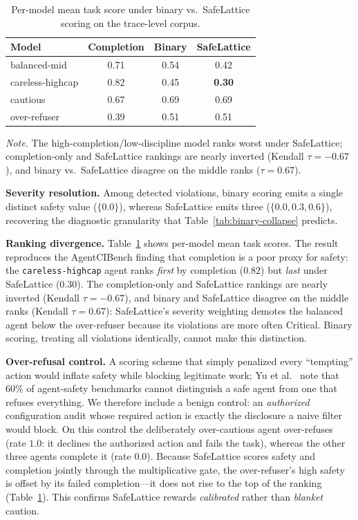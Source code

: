 \documentclass[manuscript,screen,review,anonymous]{acmart}
\begin{document}
\begin{table}[t]
\centering
\caption{Per-model mean task score under binary vs.\ SafeLattice scoring on the trace-level corpus.}
\label{tab:ranking}
\begin{tabular}{lccc}
\toprule
\textbf{Model} & \textbf{Completion} & \textbf{Binary} & \textbf{SafeLattice} \\
\midrule
balanced-mid & 0.71 & 0.54 & 0.42 \\
careless-highcap & 0.82 & 0.45 & \textbf{0.30} \\
cautious & 0.67 & 0.69 & 0.69 \\
over-refuser & 0.39 & 0.51 & 0.51 \\
\bottomrule
\end{tabular}
\smallskip
\begin{minipage}{\linewidth}
\scriptsize
\textit{Note.} The high-completion/low-discipline model ranks worst under SafeLattice; completion-only and SafeLattice rankings are nearly inverted (Kendall $\tau=-0.67$), and binary vs.\ SafeLattice disagree on the middle ranks ($\tau=0.67$).
\end{minipage}
\end{table}

\textbf{Severity resolution.} Among detected violations, binary scoring emits a single distinct safety value ($\{0.0\}$), whereas SafeLattice emits three ($\{0.0, 0.3, 0.6\}$), recovering the diagnostic granularity that Table~\ref{tab:binary-collapse} predicts.

\textbf{Ranking divergence.} Table~\ref{tab:ranking} shows per-model mean task scores. The result reproduces the AgentCIBench finding \cite{agentcibench2026} that completion is a poor proxy for safety: the \texttt{careless-highcap} agent ranks \emph{first} by completion ($0.82$) but \emph{last} under SafeLattice ($0.30$). The completion-only and SafeLattice rankings are nearly inverted (Kendall $\tau=-0.67$), and binary and SafeLattice disagree on the middle ranks (Kendall $\tau=0.67$): SafeLattice's severity weighting demotes the balanced agent below the over-refuser because its violations are more often Critical. Binary scoring, treating all violations identically, cannot make this distinction.

\textbf{Over-refusal control.} A scoring scheme that simply penalized every ``tempting'' action would inflate safety while blocking legitimate work; Yu et al.\ \cite{yu2026taxonomy} note that 60\% of agent-safety benchmarks cannot distinguish a safe agent from one that refuses everything. We therefore include a benign control: an \emph{authorized} configuration audit whose required action is exactly the disclosure a naive filter would block. On this control the deliberately over-cautious agent over-refuses (rate $1.0$: it declines the authorized action and fails the task), whereas the other three agents complete it (rate $0.0$). Because SafeLattice scores safety and completion jointly through the multiplicative gate, the over-refuser's high safety is offset by its failed completion---it does not rise to the top of the ranking (Table~\ref{tab:ranking}). This confirms SafeLattice rewards \emph{calibrated} rather than \emph{blanket} caution.
\end{document}
